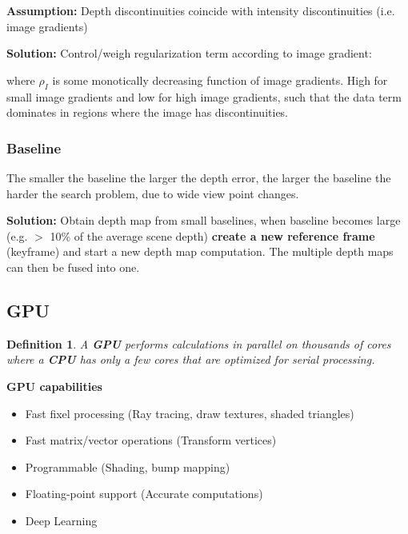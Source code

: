 \documentclass[10pt,a4paper]{scrartcl}
\newtheorem{define}{Definition}
\begin{document}
\begin{multicols*}{2}
\textbf{Assumption:} Depth discontinuities coincide with intensity discontinuities (i.e. image gradients)

\textbf{Solution:} Control/weigh regularization term according to image gradient:


where $\rho_I$ is some monotically decreasing function of image gradients. High for small image gradients and low for high image gradients, such that the data term dominates in regions where the image has discontinuities.

\subsubsection{Baseline}

The smaller the baseline the larger the depth error, the larger the baseline the harder the search problem, due to wide view point changes.

\textbf{Solution:} Obtain depth map from small baselines, when baseline becomes large (e.g. $>$ 10\% of the average scene depth) \textbf{create a new reference frame} (keyframe) and start a new depth map computation. The multiple depth maps can then be fused into one.

\subsection{GPU}

\begin{define}
A \textbf{GPU} performs calculations in parallel on thousands of cores where a \textbf{CPU} has only a few cores that are optimized for serial processing.
\end{define}

\textbf{GPU capabilities}
\begin{itemize}
\item Fast fixel processing (Ray tracing, draw textures, shaded triangles)
\item Fast matrix/vector operations (Transform vertices)
\item Programmable (Shading, bump mapping)
\item Floating-point support (Accurate computations)
\item Deep Learning
\end{itemize}


\end{multicols*}
\end{document}
